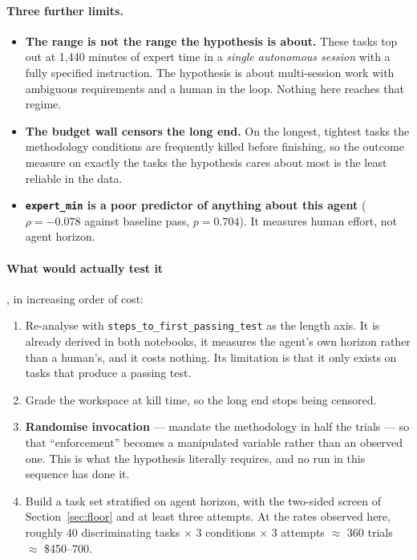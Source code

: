 \documentclass[11pt,a4paper]{article}
\newcommand{\code}[1]{\texttt{\small #1}}
\begin{document}
\paragraph{Three further limits.}
\begin{itemize}
\item \textbf{The range is not the range the hypothesis is about.} These tasks top out at
      1{,}440 minutes of expert time in a \emph{single autonomous session} with a fully
      specified instruction. The hypothesis is about multi-session work with ambiguous
      requirements and a human in the loop. Nothing here reaches that regime.
\item \textbf{The budget wall censors the long end.} On the longest, tightest tasks the
      methodology conditions are frequently killed before finishing, so the outcome measure on
      exactly the tasks the hypothesis cares about most is the least reliable in the data.
\item \textbf{\code{expert\_min} is a poor predictor of anything about this agent}
      ($\rho = -0.078$ against baseline pass, $p = 0.704$). It measures human effort, not
      agent horizon.
\end{itemize}

\paragraph{What would actually test it}, in increasing order of cost:
\begin{enumerate}
\item Re-analyse with \code{steps\_to\_first\_passing\_test} as the length axis. It is already
      derived in both notebooks, it measures the agent's own horizon rather than a human's,
      and it costs nothing. Its limitation is that it only exists on tasks that produce a
      passing test.
\item Grade the workspace at kill time, so the long end stops being censored.
\item \textbf{Randomise invocation} --- mandate the methodology in half the trials --- so that
      ``enforcement'' becomes a manipulated variable rather than an observed one. This is what
      the hypothesis literally requires, and no run in this sequence has done it.
\item Build a task set stratified on agent horizon, with the two-sided screen of
      Section~\ref{sec:floor} and at least three attempts. At the rates observed here, roughly
      40 discriminating tasks $\times$ 3 conditions $\times$ 3 attempts $\approx$ 360 trials
      $\approx$ \$450--700.
\end{enumerate}
\end{document}
